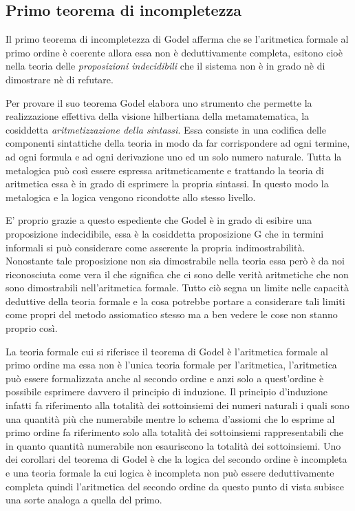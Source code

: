 \subsection{Primo teorema di incompletezza}

Il primo teorema di incompletezza di Godel afferma che se l'aritmetica
formale al primo ordine è coerente allora essa non è deduttivamente
completa, esitono cioè nella teoria delle \emph{proposizioni indecidibili
}che il sistema non è in grado nè di dimostrare nè di refutare. 

Per provare il suo teorema Godel elabora uno strumento che permette
la realizzazione effettiva della visione hilbertiana della metamatematica,
la cosiddetta\emph{ aritmetizzazione della sintassi}. Essa consiste
in una codifica delle componenti sintattiche della teoria in modo
da far corrispondere ad ogni termine, ad ogni formula e ad ogni derivazione
uno ed un solo numero naturale. Tutta la metalogica può così essere
espressa aritmeticamente e trattando la teoria di aritmetica essa
è in grado di esprimere la propria sintassi. In questo modo la metalogica
e la logica vengono ricondotte allo stesso livello.

E' proprio grazie a questo espediente che Godel è in grado di esibire
una proposizione indecidibile, essa è la cosiddetta proposizione G
che in termini informali si può considerare come asserente la propria
indimostrabilità. Nonostante tale proposizione non sia dimostrabile
nella teoria essa però è da noi riconosciuta come vera il che significa
che ci sono delle verità aritmetiche che non sono dimostrabili nell'aritmetica
formale. Tutto ciò segna un limite nelle capacità deduttive della
teoria formale e la cosa potrebbe portare a considerare tali limiti
come propri del metodo assiomatico stesso ma a ben vedere le cose
non stanno proprio così.

La teoria formale cui si riferisce il teorema di Godel è l'aritmetica
formale al primo ordine ma essa non è l'unica teoria formale per l'aritmetica,
l'aritmetica può essere formalizzata anche al secondo ordine e anzi
solo a quest'ordine è possibile esprimere davvero il principio di
induzione. Il principio d'induzione infatti fa riferimento alla totalità
dei sottoinsiemi dei numeri naturali i quali sono una quantità più
che numerabile mentre lo schema d'assiomi che lo esprime al primo
ordine fa riferimento solo alla totalità dei sottoinsiemi rappresentabili
che in quanto quantità numerabile non esauriscono la totalità dei
sottoinsiemi. Uno dei corollari del teorema di Godel è che la logica
del secondo ordine è incompleta e una teoria formale la cui logica
è incompleta non può essere deduttivamente completa quindi l'aritmetica
del secondo ordine da questo punto di vista subisce una sorte analoga
a quella del primo. 

